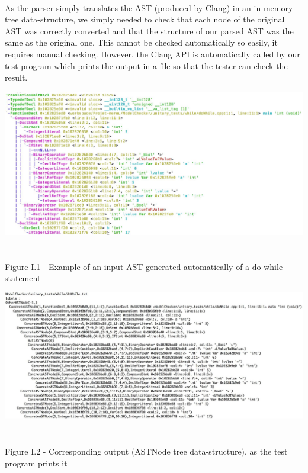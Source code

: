 \documentclass{report}
\begin{document}
\paragraph{}
\hspace{4mm}\textnormal{As the parser simply translates the AST (produced by Clang) in an in-memory tree data-structure, we simply needed to check that
each node of the original AST was correctly converted and that the structure of our parsed AST was the same as the original one.
This cannot be checked automatically so easily, it requires manual checking. However, the Clang API is automatically called by our test
program which prints the output in a file so that the tester can check the result.}

\begin{center}
\includegraphics[scale=0.26]{data/dowhile_clang.jpg}
~\\~\\Figure I.1 - Example of an input AST generated automatically of a do-while statement
\end{center}

\begin{center}
\includegraphics[scale=0.26]{data/while_astNode.jpg}
~\\~\\Figure I.2 - Corresponding output (ASTNode tree data-structure), as the test program prints it
\end{center}
\end{document}
